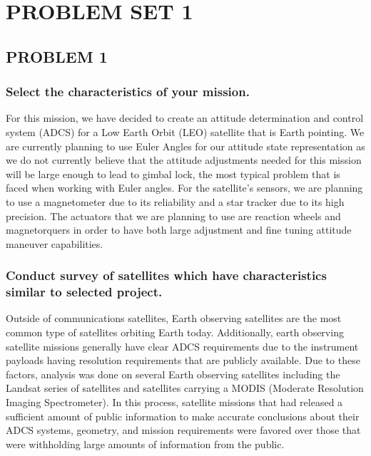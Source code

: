 \section{\Large PROBLEM SET 1}
\subsection{PROBLEM 1}

\subsubsection{Select the characteristics of your mission.} \label{sec:char}

For this mission, we have decided to create an attitude determination and control system (ADCS) for a Low Earth Orbit (LEO) satellite that is Earth pointing. We are currently planning to use Euler Angles for our attitude state representation as we do not currently believe that the attitude adjustments needed for this mission will be large enough to lead to gimbal lock, the most typical problem that is faced when working with Euler angles. For the satellite's sensors, we are planning to use a magnetometer due to its reliability and a star tracker due to its high precision. The actuators that we are planning to use are reaction wheels and magnetorquers in order to have both large adjustment and fine tuning attitude maneuver capabilities.

\subsubsection{Conduct survey of satellites which have characteristics similar to selected project.}

Outside of communications satellites, Earth observing satellites are the most common type of satellites orbiting Earth today. Additionally, earth observing satellite missions generally have clear ADCS requirements due to the instrument payloads having resolution requirements that are publicly available. Due to these factors, analysis was done on several Earth observing satellites including the Landsat series of satellites \cite{landsat} and satellites carrying a MODIS (Moderate Resolution Imaging Spectrometer). \cite{mril} In this process, satellite missions that had released a sufficient amount of public information to make accurate conclusions about their ADCS systems, geometry, and mission requirements were favored over those that were withholding large amounts of information from the public.

